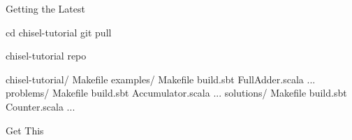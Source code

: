 \documentclass[xcolor=pdflatex,dvipsnames,table]{beamer}
\begin{document}
\begin{frame}[fragile]{Getting the Latest}

\begin{scala}
cd chisel-tutorial
git pull
\end{scala}

\end{frame}

\begin{frame}[fragile]{chisel-tutorial repo}
\begin{FramedSemiVerb}
chisel-tutorial/  
  Makefile
  examples/   
    Makefile  
    build.sbt 
    FullAdder.scala ...
  problems/   
    Makefile
    build.sbt 
    Accumulator.scala ...
  solutions/  
    Makefile
    build.sbt 
    Counter.scala ...
\end{FramedSemiVerb}
\end{frame}

\begin{frame}[fragile]{Get This}

\begin{center}
\end{center}

\end{frame}
\end{document}
